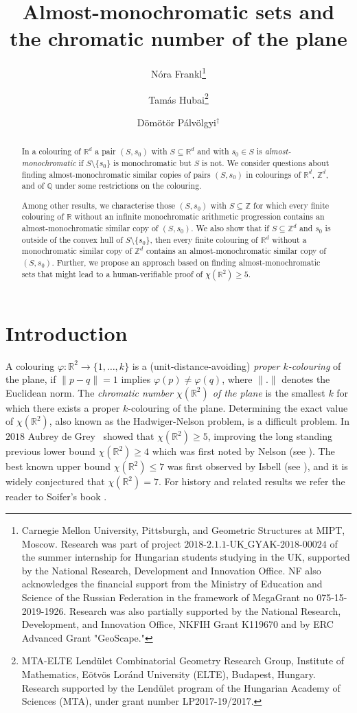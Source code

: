 \documentclass[12pt]{article}
\date{}
\author{N\'ora Frankl\footnote{Carnegie Mellon University, Pittsburgh, and Geometric Structures at MIPT, Moscow. Research was part of project $\textrm{2018-2.1.1-UK}\_\textrm{GYAK-2018-00024}$ of the summer internship for Hungarian students studying in the UK, supported by the National Research, Development and Innovation Office. NF also acknowledges the financial support from the Ministry of Education and Science of the Russian Federation in the framework of MegaGrant no 075-15-2019-1926. Research was also partially supported by the National Research, Development, and Innovation Office, NKFIH Grant K119670 and by ERC Advanced Grant "GeoScape."} \and Tam\'as Hubai\footnote{MTA-ELTE Lend\"ulet Combinatorial Geometry Research Group, Institute of Mathematics, E\"otv\"os Lor\'and University (ELTE), Budapest, Hungary. Research supported by the Lend\"ulet program of the Hungarian Academy of Sciences (MTA), under grant number LP2017-19/2017.}\and  D\"om\"ot\"or P\'alv\"olgyi$^\dagger$}
\title{Almost-monochromatic sets
and the chromatic number of the plane}
\newcommand{\R}{{\mathbb R}}
\theoremstyle{plain}
\theoremstyle{definition}
\begin{document}
\maketitle

\begin{abstract}
    In a colouring of $\mathbb{R}^d$ a pair $(S,s_0)$ with $S\subseteq \mathbb{R}^d$ and with $s_0\in S$ is \emph{almost-monochromatic} if $S\setminus \{s_0\}$ is monochromatic but $S$ is not. We consider questions about finding almost-monochromatic similar copies of pairs $(S,s_0)$ in colourings of $\mathbb{R}^d$, $\mathbb{Z}^d$, and of $\mathbb{Q}$ under some restrictions on the colouring.
    
    Among other results, we characterise those $(S,s_0)$ with $S\subseteq \mathbb{Z}$ for which every finite colouring of $\mathbb{R}$ without an infinite monochromatic arithmetic progression contains an almost-monochromatic similar copy of $(S,s_0)$. We also show that if $S\subseteq \mathbb{Z}^d$ and $s_0$ is outside of the convex hull of $S\setminus \{s_0\}$, then every finite colouring of $\mathbb{R}^d$ without a monochromatic similar copy of $\mathbb{Z}^d$ contains an almost-monochromatic similar copy of $(S,s_0)$.
    Further, we propose an approach based on finding almost-monochromatic sets that might lead to a human-verifiable proof of $\chi(\R^2)\geq 5$.
\end{abstract}


\section{Introduction}

A colouring $\varphi: \R^2\to \{1,\dots,k\}$ is a (unit-distance-avoiding) \emph{proper $k$-colouring} of the plane, if $\|p-q\|=1$ implies $\varphi(p)\ne \varphi(q)$, where $\|.\|$ denotes the Euclidean norm. The \emph{chromatic number $\chi(\mathbb{R}^2)$ of the plane} is the smallest $k$ for which there exists a proper $k$-colouring of the plane. Determining the exact value of $\chi(\mathbb{R}^2)$, also known as the Hadwiger-Nelson problem, is a difficult problem. 
In $2018$ Aubrey de Grey~\cite{degrey} showed that $\chi(\mathbb{R}^2)\geq 5$, improving the long standing previous lower bound $\chi(\mathbb{R}^2)\geq 4$ which was first noted by Nelson (see \cite{soiferbook}). The best known upper bound $\chi(\mathbb{R}^2)\leq 7$ was first observed by Isbell (see \cite{soiferbook}), and it is widely conjectured that $\chi(\mathbb{R}^2)=7$.
For history and related results we refer the reader to Soifer's book \cite{soiferbook}.
\end{document}
